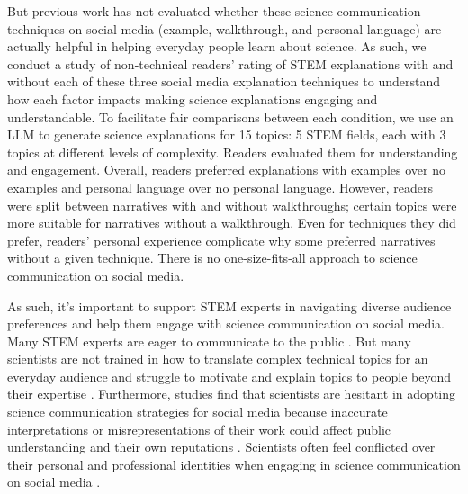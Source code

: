 But previous work has not evaluated whether these science communication techniques on social media (example, walkthrough, and personal language) are actually helpful in helping everyday people learn about science. As such, we conduct a study of non-technical readers' rating of STEM explanations with and without each of these three social media explanation techniques to understand how each factor impacts making science explanations engaging and understandable. To facilitate fair comparisons between each condition, we use an LLM to generate science explanations for 15 topics: 5 STEM fields, each with 3 topics at different levels of complexity. Readers evaluated them for understanding and engagement. Overall, readers preferred explanations with examples over no examples and personal language over no personal language. However, readers were split between narratives with and without walkthroughs; certain topics were more suitable for narratives without a walkthrough. Even for techniques they did prefer, readers' personal experience complicate why some preferred narratives without a given technique. There is no one-size-fits-all approach to science communication on social media. 

As such, it's important to support STEM experts in navigating diverse audience preferences and help them engage with science communication on social media. Many STEM experts are eager to communicate to the public \cite{della2021expert}. But many scientists are not trained in how to translate complex technical topics for an everyday audience and struggle to motivate and explain topics to people beyond their expertise \cite{williams2022hci}. Furthermore, studies find that scientists are hesitant in adopting science communication strategies for social media because inaccurate interpretations or misrepresentations of their work could affect public understanding and their own reputations \cite{lorono2018responsibility, 10.1145/3479566}. Scientists often feel conflicted over their personal and professional identities when engaging in science communication on social media \cite{koivumaki2020social}. 

